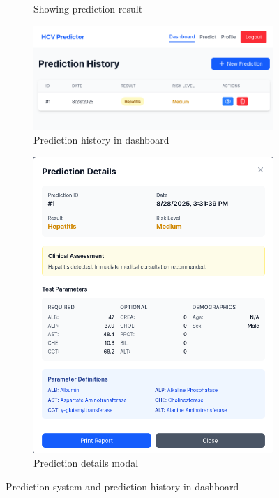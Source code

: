 \begin{figure}[htbp]
\begin{subfigure}{0.5\textwidth}
    \caption{Showing prediction result}
    \label{fig:predict}
  \end{subfigure}
  \begin{subfigure}{\textwidth}
    \includegraphics[width=\textwidth]{figures/site/dashboard.png}
    \caption{Prediction history in dashboard}
    \label{fig:dashboard}
  \end{subfigure}
  \begin{subfigure}{0.45\textwidth}
    \includegraphics[width=\textwidth]{figures/site/details.png}
    \caption{Prediction details modal}
    \label{fig:details}
  \end{subfigure}
  \caption{Prediction system and prediction history in dashboard}
  \label{fig:image2}
\end{figure}


